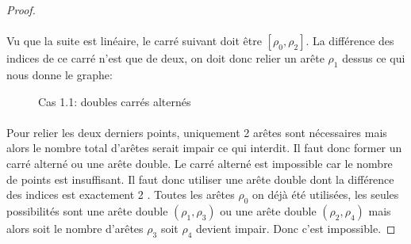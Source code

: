 \begin{proof}
  \paragraph{}
  Vu que la suite est linéaire, le carré suivant doit être $[\rho_0, \rho_2]$. La différence des indices de ce carré n'est que de deux, on doit donc relier un arête $\rho_1$ dessus ce qui nous donne le graphe:


  \begin{figure}[H]
    \begin{center}
      \caption{Cas 1.1: doubles carrés alternés}
    \end{center}
  \end{figure}

  \paragraph{}
  Pour relier les deux derniers points, uniquement 2 arêtes sont nécessaires mais alors le nombre total d'arêtes serait impair ce qui interdit. Il faut donc former un carré alterné ou une arête double. Le carré alterné est impossible car le nombre de points est insuffisant. Il faut donc utiliser une arête double dont la différence des indices est exactement 2 . Toutes les arêtes $\rho_0$ on déjà été utilisées, les seules possibilités sont une arête double $(\rho_1,\rho_3)$ ou une arête double $(\rho_2,\rho_4)$ mais alors soit le nombre d'arêtes $\rho_3$ soit $\rho_4$ devient impair. Donc c'est impossible.
\end{proof}

